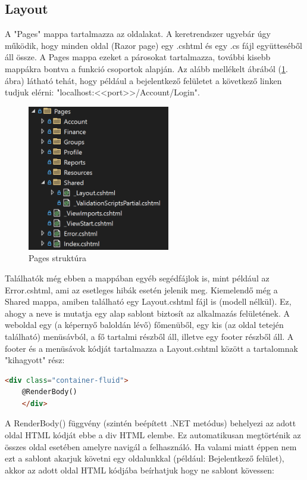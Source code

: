 \subsection{Layout}
A "Pages" mappa tartalmazza az oldalakat. A keretrendszer ugyebár úgy működik, hogy minden oldal (Razor page) egy .cshtml és egy .cs
fájl együtteséből áll össze. A Pages mappa ezeket a párosokat tartalmazza, további kisebb mappákra bontva a funkció csoportok alapján. Az alább mellékelt ábrából (\ref{fig:pages-structure}. ábra) látható tehát, hogy például a bejelentkező felületet a következő linken tudjuk elérni: "localhost:<<port>>/Account/Login".

\begin{figure}[H]
	\centering
	\includegraphics[height=240px]{img/solution-explorer-pages-screenshot}
	\caption{Pages struktúra}
	\label{fig:pages-structure}
\end{figure}

Találhatók még ebben a mappában egyéb segédfájlok is, mint például az Error.cshtml, ami az esetleges hibák esetén jelenik meg. Kiemelendő még a Shared mappa, amiben található egy Layout.cshtml fájl is (modell nélkül). Ez, ahogy a neve is mutatja egy alap sablont biztosít az alkalmazás felületének. A weboldal egy (a képernyő baloldán lévő) főmenüből, egy kis (az oldal tetején található) menüsávból, a fő tartalmi részből áll, illetve egy footer részből áll. A footer és a menüsávok kódját tartalmazza a Layout.cshtml között a tartalomnak "kihagyott" rész: 
\begin{lstlisting}[language={HTML}]
	<div class="container-fluid">
	@RenderBody()
	</div>
\end{lstlisting}

A RenderBody() függvény (szintén beépített .NET metódus)
behelyezi az adott oldal HTML kódját ebbe a div HTML elembe. Ez
automatikusan megtörténik az összes oldal esetében amelyre
navigál a felhasználó. Ha valami miatt éppen nem ezt a sablont akarjuk követni egy oldalunkkal (például: Bejelentkező felület), akkor az adott oldal HTML kódjába beírhatjuk hogy ne sablont kövessen:

